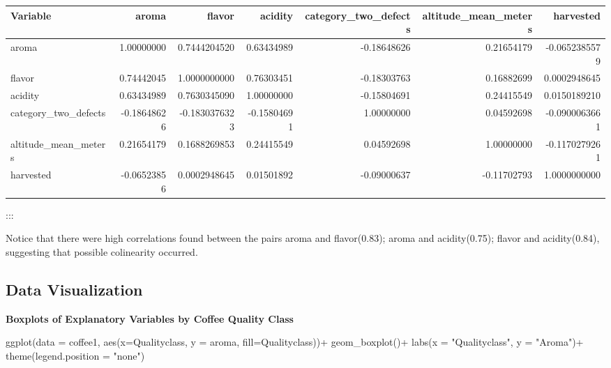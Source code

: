 \documentclass[
  letterpaper,
  DIV=11,
  numbers=noendperiod]{scrartcl}
\newenvironment{Shaded}{\begin{snugshade}}{\end{snugshade}}
\newcommand{\AttributeTok}[1]{\textcolor[rgb]{0.40,0.45,0.13}{#1}}
\newcommand{\FunctionTok}[1]{\textcolor[rgb]{0.28,0.35,0.67}{#1}}
\newcommand{\NormalTok}[1]{\textcolor[rgb]{0.00,0.23,0.31}{#1}}
\newcommand{\SpecialCharTok}[1]{\textcolor[rgb]{0.37,0.37,0.37}{#1}}
\newcommand{\StringTok}[1]{\textcolor[rgb]{0.13,0.47,0.30}{#1}}
\begin{document}
\begin{table}
\fontsize{12.0pt}{14.4pt}\selectfont
\begin{tabular*}{\linewidth}{@{\extracolsep{\fill}}lrrrrrr}
\toprule
Variable & aroma & flavor & acidity & category\_two\_defects & altitude\_mean\_meters & harvested \\ 
\midrule\addlinespace[2.5pt]
aroma & 1.00000000 & 0.7444204520 & 0.63434989 & -0.18648626 & 0.21654179 & -0.0652385579 \\ 
flavor & 0.74442045 & 1.0000000000 & 0.76303451 & -0.18303763 & 0.16882699 & 0.0002948645 \\ 
acidity & 0.63434989 & 0.7630345090 & 1.00000000 & -0.15804691 & 0.24415549 & 0.0150189210 \\ 
category\_two\_defects & -0.18648626 & -0.1830376323 & -0.15804691 & 1.00000000 & 0.04592698 & -0.0900063661 \\ 
altitude\_mean\_meters & 0.21654179 & 0.1688269853 & 0.24415549 & 0.04592698 & 1.00000000 & -0.1170279261 \\ 
harvested & -0.06523856 & 0.0002948645 & 0.01501892 & -0.09000637 & -0.11702793 & 1.0000000000 \\ 
\bottomrule
\end{tabular*}
\end{table}

:::

Notice that there were high correlations found between the pairs aroma
and flavor(0.83); aroma and acidity(0.75); flavor and acidity(0.84),
suggesting that possible colinearity occurred.

\subsection{Data Visualization}\label{data-visualization}

\textbf{Boxplots of Explanatory Variables by Coffee Quality Class}

\begin{Shaded}
\begin{Highlighting}[]
\FunctionTok{ggplot}\NormalTok{(}\AttributeTok{data =}\NormalTok{ coffee1, }\FunctionTok{aes}\NormalTok{(}\AttributeTok{x=}\NormalTok{Qualityclass, }
                           \AttributeTok{y =}\NormalTok{ aroma, }
                           \AttributeTok{fill=}\NormalTok{Qualityclass))}\SpecialCharTok{+}
  \FunctionTok{geom\_boxplot}\NormalTok{()}\SpecialCharTok{+}
  \FunctionTok{labs}\NormalTok{(}\AttributeTok{x =} \StringTok{"Qualityclass"}\NormalTok{, }\AttributeTok{y =} \StringTok{"Aroma"}\NormalTok{)}\SpecialCharTok{+}
  \FunctionTok{theme}\NormalTok{(}\AttributeTok{legend.position =} \StringTok{"none"}\NormalTok{)}
\end{Highlighting}
\end{Shaded}
\end{document}
